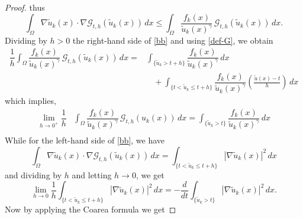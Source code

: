 \documentclass[10pt,a4paper]{amsart}
\begin{document}
\begin{proof}
thus
\begin{equation}\label{bb}
\int_\Omega\nabla \tilde u_k(x)\cdot\nabla\mathcal{G}_{t,h}(\tilde u_k(x))\,dx\leq \int_{\Omega}\frac{f_k(x)}{\tilde u_k(x)^{\gamma}}\,\mathcal{G}_{t,h}(\tilde u_k(x))\,dx.
\end{equation}
Dividing by $h>0$ the right-hand side of \eqref{bb} and using \eqref{def-G}, we obtain
\begin{equation*}
\begin{aligned}
\dfrac{1}{h} \int_{\Omega}\dfrac{f_k(x)}{\tilde u_k(x)^{\gamma}}\,\mathcal{G}_{t,h}(\tilde u_k(x))\,dx = &\int_{\{\tilde u_k>t+h\}}\dfrac{f_k(x)}{\tilde u_k(x)^{\gamma}}\,dx\\
&\ \ \ \ +\int_{\{t<\tilde u_k\leq t+h\}}\dfrac{f_k(x)}{\tilde u_k(x)^{\gamma}}\left( \frac{\tilde u(x)-t}{h}\right)\,dx\end{aligned}
\end{equation*}
which implies, %
\begin{equation}\label{lim-RHS}
	\begin{aligned}
    \lim_{h\to 0^+}\dfrac{1}{h}& \int_{\Omega}\dfrac{f_k(x)}{\tilde u_k(x)^{\gamma}}\,\mathcal{G}_{t,h}(u_k(x))\,dx =\int_{\{\tilde u_k>t\}}\dfrac{f_k(x)}{\tilde u_k(x)^{\gamma}}\,dx\\
\end{aligned}
\end{equation}
While for the left-hand side of \eqref{bb}, we have
\begin{equation*}
    \int_\Omega\nabla \tilde u_k(x)\cdot\nabla\mathcal{G}_{t,h}(\tilde u_k(x))\,dx=\int_{\{t<\tilde u_k\leq t+h\}}|\nabla \tilde u_k(x)|^2 \,dx
\end{equation*}
and dividing by $h$ and letting $h\to 0$, we get
\begin{equation}\label{lim-LHS}
    \lim_{h\to0}\frac{1}{h}\int_{\{t<\tilde u_k\leq t+h\}}|\nabla \tilde u_k(x)|^2\, dx=-\frac{d}{dt}\int_{\{\tilde u_k>t\}}|\nabla \tilde u_k(x)|^2\, dx.
\end{equation}
Now by applying the Coarea formula we get

\end{proof}
\end{document}
